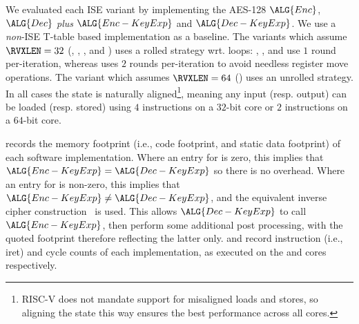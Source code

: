
We evaluated each ISE variant by implementing the AES-128
$\ALG{Enc}$,
$\ALG{Dec}$
{\em plus}
$\ALG{Enc-KeyExp}$
and
$\ALG{Dec-KeyExp}$.
We use a {\em non}-ISE 
T-table based
implementation as a baseline.
The variants which assume  $\RVXLEN = 32$
(, ,     , and )
uses a    rolled strategy wrt. loops:
 , ,              and 
use  $1$ round  per-iteration,
whereas
uses $2$ rounds per-iteration
to avoid needless register move operations.
The variant  which assumes $\RVXLEN = 64$
()
uses an unrolled strategy.
In all cases the state is naturally aligned\footnote{%
RISC-V does not mandate support for misaligned loads and stores, so
aligning the state this way ensures the best performance across all
cores.
}, meaning any input (resp. output) can be loaded (resp. stored) 
using 
$4$  instructions on a $32$-bit core
or
$2$  instructions on a $64$-bit core.

records the
memory footprint (i.e., code footprint, and static data footprint)
of each software implementation.
Where an entry for
is     zero, this implies that
$\ALG{Enc-KeyExp} =    \ALG{Dec-KeyExp}$
so there is no overhead.
Where an entry for
is non-zero, this implies that
$\ALG{Enc-KeyExp} \neq \ALG{Dec-KeyExp}$,
and the equivalent inverse cipher construction~\cite[Section 5.3.5]{FIPS:197}
is used.
This allows $\ALG{Dec-KeyExp}$ to
call $\ALG{Enc-KeyExp}$,
then
perform some additional post processing,
with the quoted footprint therefore reflecting the latter only.  
and
record
instruction (i.e., iret) and cycle counts
of each implementation,
as executed on the  and  cores respectively.

